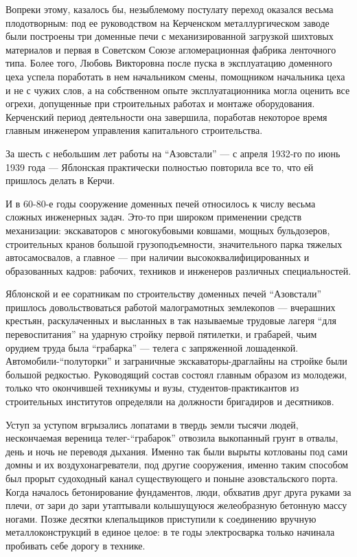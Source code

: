 
Вопреки этому, казалось бы, незыблемому постулату переход оказался весьма
плодотворным: под ее руководством на Керченском металлургическом заводе были
построены три доменные печи с механизированной загрузкой шихтовых материалов и
первая в Советском Союзе агломерационная фабрика ленточного типа. Более того,
Любовь Викторовна после пуска в эксплуатацию доменного цеха успела поработать в
нем начальником смены, помощником начальника цеха и не с чужих слов, а на
собственном опыте эксплуатационника могла оценить все огрехи, допущенные при
строительных работах и монтаже оборудования. Керченский период деятельности она
завершила, поработав некоторое время главным инженером управления капитального
строительства.

За шесть с небольшим лет работы на \enquote{Азовстали} — с апреля 1932-го по июнь 1939
года — Яблонская практически полностью повторила все то, что ей пришлось делать
в Керчи.

И в 60-80-е годы сооружение доменных печей относилось к числу весьма сложных
инженерных задач. Это-то при широком применении средств механизации:
экскаваторов с многокубовыми ковшами, мощных бульдозеров, строительных кранов
большой грузоподъемности, значительного парка тяжелых автосамосвалов, а главное
— при наличии высококвалифицированных и образованных кадров: рабочих, техников
и инженеров различных специальностей.

Яблонской и ее соратникам по строительству доменных печей \enquote{Азовстали} пришлось
довольствоваться работой малограмотных землекопов — вчерашних крестьян,
раскулаченных и высланных в так называемые трудовые лагеря \enquote{для перевоспитания}
на ударную стройку первой пятилетки, и грабарей, чьим орудием труда была
\enquote{грабарка} — телега с запряженной лошаденкой. Автомобили-\enquote{полуторки} и
заграничные экскаваторы-драглайны на стройке были большой редкостью.
Руководящий состав состоял главным образом из молодежи, только что окончившей
техникумы и вузы, студентов-практикантов из строительных институтов определяли
на должности бригадиров и десятников.

Уступ за уступом вгрызались лопатами в твердь земли тысячи людей, нескончаемая
вереница телег-\enquote{грабарок} отвозила выкопанный грунт в отвалы, день и ночь не
переводя дыхания. Именно так были вырыты котлованы под сами домны и их
воздухонагреватели, под другие сооружения, именно таким способом был прорыт
судоходный канал существующего и поныне азовстальского порта. Когда началось
бетонирование фундаментов, люди, обхватив друг друга руками за плечи, от зари
до зари утаптывали колышущуюся желеобразную бетонную массу ногами. Позже
десятки клепальщиков приступили к соединению вручную металлоконструкций в
единое целое: в те годы электросварка только начинала пробивать себе дорогу в
технике.

